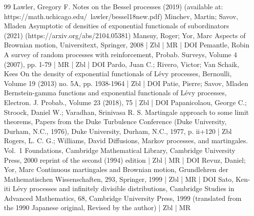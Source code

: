 \begin{thebibliography}{99}
Lawler, Gregory F. Notes on the Bessel processes (2019) (available at: https://math.uchicago.edu/~lawler/bessel18new.pdf)
Minchev, Martin; Savov, Mladen Asymptotic of densities of exponential functionals of subordinators (2021) (https://arxiv.org/abs/2104.05381)
Mansuy, Roger; Yor, Marc Aspects of Brownian motion, Universitext, Springer, 2008 | Zbl | MR | DOI
Pemantle, Robin A survey of random processes with reinforcement, Probab. Surveys, Volume 4 (2007), pp. 1-79 | MR | Zbl | DOI
Pardo, Juan C.; Rivero, Victor; Van Schaik, Kees On the density of exponential functionals of Lévy processes, Bernoulli, Volume 19 (2013) no. 5A, pp. 1938-1964 | Zbl | DOI
Patie, Pierre; Savov, Mladen Bernstein-gamma functions and exponential functionals of Lévy processes, Electron. J. Probab., Volume 23 (2018), 75 | Zbl | DOI
Papanicolaou, George C.; Stroock, Daniel W.; Varadhan, Srinivasa R. S. Martingale approach to some limit theorems, Papers from the Duke Turbulence Conference (Duke University, Durham, N.C., 1976), Duke University, Durham, N.C., 1977, p. ii+120 | Zbl
Rogers, L. C. G.; Williams, David Diffusions, Markov processes, and martingales. Vol. 1 Foundations, Cambridge Mathematical Library, Cambridge University Press, 2000 reprint of the second (1994) edition | Zbl | MR | DOI
Revuz, Daniel; Yor, Marc Continuous martingales and Brownian motion, Grundlehren der Mathematischen Wissenschaften, 293, Springer, 1999 | Zbl | MR | DOI
Sato, Ken-iti Lévy processes and infinitely divisible distributions, Cambridge Studies in Advanced Mathematics, 68, Cambridge University Press, 1999 (translated from the 1990 Japanese original, Revised by the author) | Zbl | MR
\end{thebibliography}
